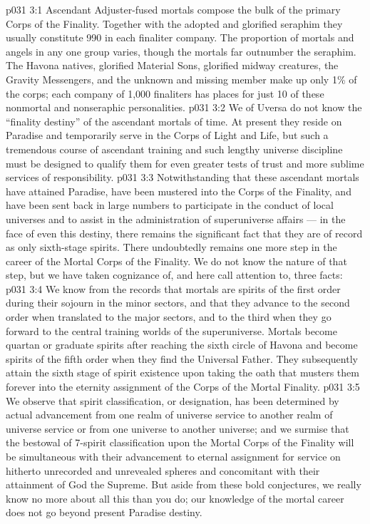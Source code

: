 \vs p031 3:1 Ascendant Adjuster\hyp{}fused mortals compose the bulk of the primary Corps of the Finality. Together with the adopted and glorified seraphim they usually constitute 990 in each finaliter company. The proportion of mortals and angels in any one group varies, though the mortals far outnumber the seraphim. The Havona natives, glorified Material Sons, glorified midway creatures, the Gravity Messengers, and the unknown and missing member make up only 1\% of the corps; each company of 1,000 finaliters has places for just 10 of these nonmortal and nonseraphic personalities.
\vs p031 3:2 We of Uversa do not know the “finality destiny” of the ascendant mortals of time. At present they reside on Paradise and temporarily serve in the Corps of Light and Life, but such a tremendous course of ascendant training and such lengthy universe discipline must be designed to qualify them for even greater tests of trust and more sublime services of responsibility.
\vs p031 3:3 \pc Notwithstanding that these ascendant mortals have attained Paradise, have been mustered into the Corps of the Finality, and have been sent back in large numbers to participate in the conduct of local universes and to assist in the administration of superuniverse affairs --- in the face of even this  destiny, there remains the significant fact that they are of record as only sixth\hyp{}stage spirits. There undoubtedly remains one more step in the career of the Mortal Corps of the Finality. We do not know the nature of that step, but we have taken cognizance of, and here call attention to, three facts:
\vs p031 3:4 \bibnobreakspace We know from the records that mortals are spirits of the first order during their sojourn in the minor sectors, and that they advance to the second order when translated to the major sectors, and to the third when they go forward to the central training worlds of the superuniverse. Mortals become quartan or graduate spirits after reaching the sixth circle of Havona and become spirits of the fifth order when they find the Universal Father. They subsequently attain the sixth stage of spirit existence upon taking the oath that musters them forever into the eternity assignment of the Corps of the Mortal Finality.
\vs p031 3:5 We observe that spirit classification, or designation, has been determined by actual advancement from one realm of universe service to another realm of universe service or from one universe to another universe; and we surmise that the bestowal of 7\hyp{}spirit classification upon the Mortal Corps of the Finality will be simultaneous with their advancement to eternal assignment for service on hitherto unrecorded and unrevealed spheres and concomitant with their attainment of God the Supreme. But aside from these bold conjectures, we really know no more about all this than you do; our knowledge of the mortal career does not go beyond present Paradise destiny.
